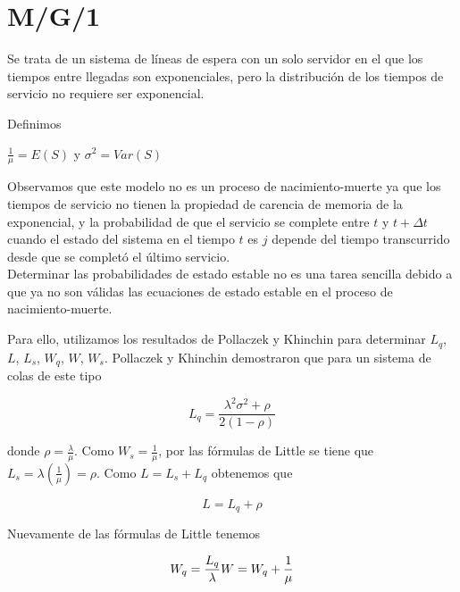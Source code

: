 
\section{M/G/1}


Se trata de un sistema de líneas de espera con un solo servidor en el que los tiempos entre llegadas son exponenciales, pero la distribución de los tiempos de servicio no requiere ser exponencial.

Definimos

\begin{center}
$\frac{1}{\mu}=E(S)$ y   $\sigma^2= Var(S)$
\end{center}

Observamos que este modelo no es un proceso de nacimiento-muerte ya que los tiempos de servicio no tienen la propiedad de carencia de memoria de la exponencial, y la probabilidad de que el servicio se complete entre $t$ y $t + \Delta t$ cuando el estado del sistema en el tiempo $t$ es $j$ depende del tiempo transcurrido desde que se completó el último servicio.\\

Determinar las probabilidades de estado estable no es una tarea sencilla debido a que ya no son válidas las ecuaciones de estado estable en el proceso de nacimiento-muerte.

Para ello, utilizamos los resultados de Pollaczek y Khinchin para determinar $L_q$, $L$, $L_s$, $W_q$, $W$, $W_s$. Pollaczek y Khinchin demostraron que para un sistema de colas de este tipo

\begin{equation}
L_q=\frac{\lambda^2 \sigma^2+\rho}{2(1-\rho)}
\end{equation}

donde $\rho=\displaystyle\frac{\lambda}{\mu}$. Como $W_s=\displaystyle\frac{1}{\mu}$, por las fórmulas de Little se tiene que $L_s=\lambda\left(\displaystyle\frac{1}{\mu}\right)=\rho$. Como $L=L_s+L_q$ obtenemos que

\begin{equation}
L=L_q+\rho
\end{equation}

Nuevamente de las fórmulas de Little tenemos

\begin{equation}
W_q=\frac{L_q}{\lambda}\\
W=W_q+\frac{1}{\mu}
\end{equation}


